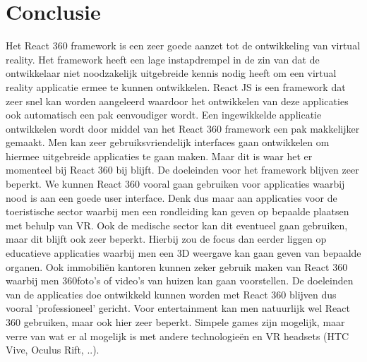 
\chapter{Conclusie}
\label{ch:conclusie}


Het React 360 framework is een zeer goede aanzet tot de ontwikkeling van virtual reality. Het framework heeft een lage instapdrempel in de zin van dat de ontwikkelaar niet noodzakelijk uitgebreide kennis nodig heeft om een virtual reality applicatie ermee te kunnen ontwikkelen. React JS is een framework dat zeer snel kan worden aangeleerd waardoor het ontwikkelen van deze applicaties ook automatisch een pak eenvoudiger wordt. Een ingewikkelde applicatie ontwikkelen wordt door middel van het React 360 framework een pak makkelijker gemaakt. Men kan zeer gebruiksvriendelijk interfaces gaan ontwikkelen om hiermee uitgebreide applicaties te gaan maken. Maar dit is waar het er momenteel bij React 360 bij blijft. De doeleinden voor het framework blijven zeer beperkt. We kunnen React 360 vooral gaan gebruiken voor applicaties waarbij nood is aan een goede user interface. Denk dus maar aan applicaties voor de toeristische sector waarbij men een rondleiding kan geven op bepaalde plaatsen met behulp van VR. Ook de medische sector kan dit eventueel gaan gebruiken, maar dit blijft ook zeer beperkt. Hierbij zou de focus dan eerder liggen op educatieve applicaties waarbij men een 3D weergave kan gaan geven van bepaalde organen. Ook immobiliën kantoren kunnen zeker gebruik maken van React 360 waarbij men 360\textdegree foto's of video's van huizen kan gaan voorstellen. De doeleinden van de applicaties doe ontwikkeld kunnen worden met React 360 blijven dus vooral 'professioneel' gericht. Voor entertainment kan men natuurlijk wel React 360 gebruiken, maar ook hier zeer beperkt. Simpele games zijn mogelijk, maar verre van wat er al mogelijk is met andere technologieën en VR headsets (HTC Vive, Oculus Rift, ..). 

